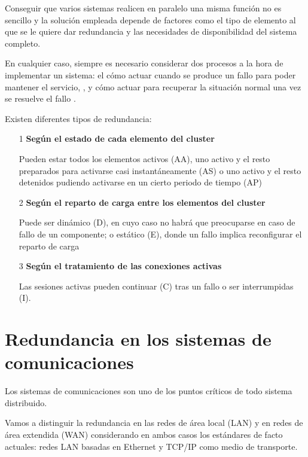 Conseguir que varios sistemas realicen en paralelo una misma función no es sencillo y la solución empleada depende de factores como el tipo de elemento al que se le quiere dar redundancia y las necesidades de disponibilidad del sistema completo.

En cualquier caso, siempre es necesario considerar dos procesos a la hora de implementar un sistema: el cómo actuar cuando se produce un fallo para poder mantener el servicio, , y cómo actuar para recuperar la situación normal una vez se resuelve el fallo .

Existen diferentes tipos de redundancia:
\begin{enumerate}
\item[1] \textbf{Según el estado de cada elemento del cluster}

Pueden estar todos los elementos activos (AA), uno activo y el resto preparados para activarse casi instantáneamente (AS) o uno activo y el resto detenidos pudiendo activarse en un cierto periodo de tiempo (AP)

\item[2] \textbf{Según el reparto de carga entre los elementos del cluster}

Puede ser dinámico (D), en cuyo caso no habrá que preocuparse en caso de fallo de un componente; o estático (E), donde un fallo implica reconfigurar el reparto de carga

\item[3] \textbf{Según el tratamiento de las conexiones activas}

Las sesiones activas pueden continuar (C) tras un fallo o ser interrumpidas (I).
\end{enumerate}

\section{Redundancia en los sistemas de comunicaciones}
Los sistemas de comunicaciones son uno de los puntos críticos de todo sistema distribuido.

Vamos a distinguir la redundancia en las redes de área local (LAN) y en redes de área extendida (WAN) considerando en ambos casos los estándares de facto actuales: redes LAN basadas en Ethernet y TCP/IP como medio de transporte.

